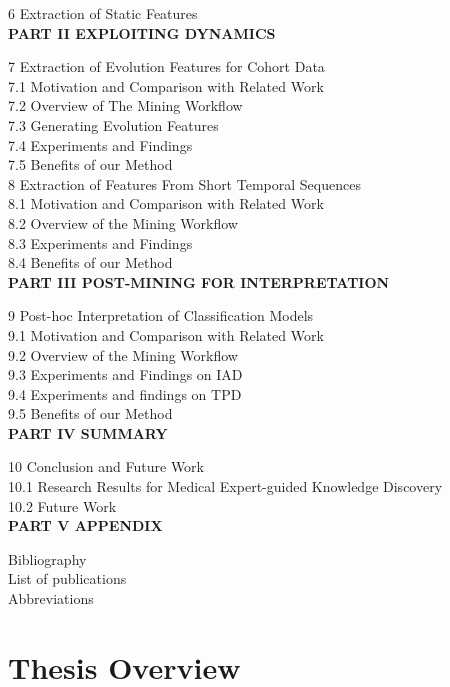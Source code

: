 \documentclass[
]{book}
\begin{document}
6 Extraction of Static Features\\

\textbf{PART II EXPLOITING DYNAMICS}

7 Extraction of Evolution Features for Cohort Data\\
7.1 Motivation and Comparison with Related Work\\
7.2 Overview of The Mining Workflow\\
7.3 Generating Evolution Features\\
7.4 Experiments and Findings\\
7.5 Benefits of our Method\\

8 Extraction of Features From Short Temporal Sequences\\
8.1 Motivation and Comparison with Related Work\\
8.2 Overview of the Mining Workflow\\
8.3 Experiments and Findings\\
8.4 Benefits of our Method\\

\textbf{PART III POST-MINING FOR INTERPRETATION}

9 Post-hoc Interpretation of Classification Models\\
9.1 Motivation and Comparison with Related Work\\
9.2 Overview of the Mining Workflow\\
9.3 Experiments and Findings on IAD\\
9.4 Experiments and findings on TPD\\
9.5 Benefits of our Method\\

\textbf{PART IV SUMMARY}

10 Conclusion and Future Work\\
10.1 Research Results for Medical Expert-guided Knowledge Discovery\\
10.2 Future Work\\

\textbf{PART V APPENDIX}

Bibliography\\
List of publications\\
Abbreviations\\

\hypertarget{intro}{%
\chapter{Thesis Overview}\label{intro}}
\end{document}
